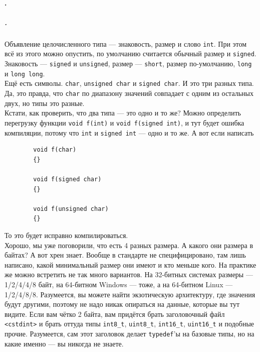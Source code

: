 \documentclass{article}
\begin{document}
    \paragraph{.}
    \subparagraph{.}
    Объявление целочисленного типа --- знаковость, размер и слово \texttt{int}. При этом всё из этого можно опустить, по умолчанию считается обычный размер и \texttt{signed}. Знаковость --- \texttt{signed} и \texttt{unsigned}, размер --- \texttt{short}, размер по-умолчанию, \texttt{long} и \texttt{long long}.\\
    Ещё есть символы. \texttt{char}, \texttt{unsigned char} и \texttt{signed char}. И это три разных типа. Да, это правда, что \texttt{char} по диапазону значений совпадает с одним из остальных двух, но типы это разные.\\
    Кстати, как проверить, что два типа --- это одно и то же? Можно определить перегрузку функции \texttt{void f(int)} и \texttt{void f(signed int)}, и тут будет ошибка компиляции, потому что \texttt{int} и \texttt{signed int} --- одно и то же. А вот если написать
    \begin{verbatim}
        void f(char)
        {}
        
        void f(signed char)
        {}
        
        void f(unsigned char)
        {}
    \end{verbatim}
    То это будет исправно компилироваться.\\
    Хорошо, мы уже поговорили, что есть 4 разных размера. А какого они размера в байтах? А вот хрен знает. Вообще в стандарте не специфицировано, там лишь написано, какой минимальный размер они имеют и кто меньше кого. На практике же можно встретить не так много вариантов. На 32-битных системах размеры --- 1/2/4/4/8 байт, на 64-битном Windows --- тоже, а на 64-битном Linux --- 1/2/4/8/8. Разумеется, вы можете найти экзотическую архитектуру, где значения будут другими, поэтому не надо никак опираться на данные, которые вы тут видите. Если вам чётко 2 байта, вам придётся брать заголовочный файл \texttt{<cstdint>} и брать оттуда типы \texttt{int8_t}, \texttt{uint8_t}, \texttt{int16_t}, \texttt{uint16_t} и подобные прочие. Разумеется, сам этот заголовок делает \texttt{typedef}'ы на базовые типы, но на какие именно --- вы никогда не знаете.\\
\end{document}

